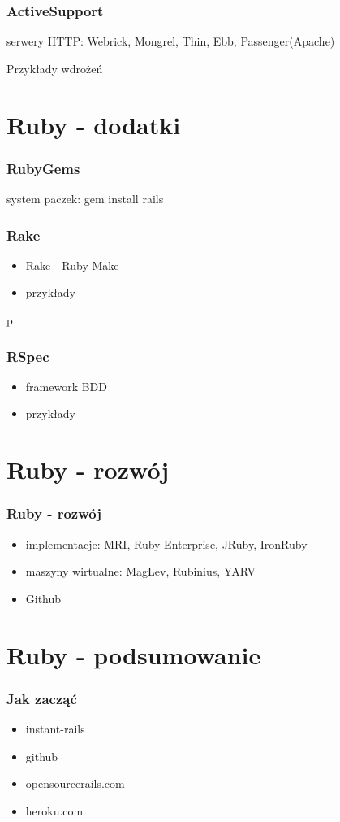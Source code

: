 \documentclass[12t]{beamer}
\begin{document}
\begin{frame}
  \frametitle{ActiveSupport}
  
\end{frame}

\begin{frame}
  serwery HTTP: Webrick, Mongrel, Thin, Ebb, Passenger(Apache)
\end{frame}

\begin{frame}
  Przykłady wdrożeń
\end{frame}

\section{Ruby - dodatki}
\begin{frame}
  \frametitle{RubyGems}
  system paczek: gem install rails
\end{frame}

\begin{frame}
  \frametitle{Rake}
  \begin{itemize}
  \item Rake - Ruby Make
  \item przykłady
  \end{itemize}
\end{frame}

\begin{frame}
p  \frametitle{RSpec}
  \begin{itemize}
  \item framework BDD
  \item przykłady
  \end{itemize}
\end{frame}

\section{Ruby - rozwój}
\begin{frame}
  \frametitle{Ruby - rozwój}
  \begin{itemize}
  \item implementacje: MRI, Ruby Enterprise, JRuby, IronRuby
  \item maszyny wirtualne: MagLev, Rubinius, YARV
  \item Github
  \end{itemize}
\end{frame}

\section{Ruby - podsumowanie}
\begin{frame}
  \frametitle{Jak zacząć}
  \begin{itemize}
  \item instant-rails
  \item github
  \item opensourcerails.com
  \item heroku.com
  \end{itemize}
\end{frame}
\end{document}
